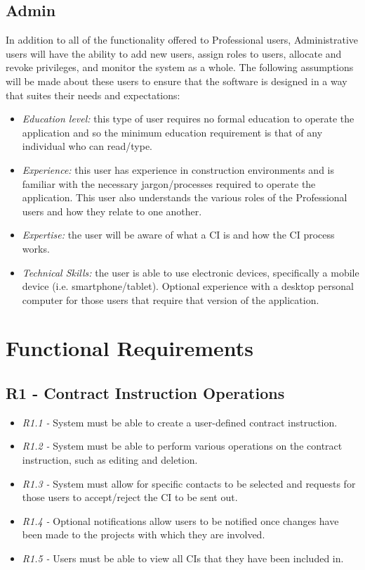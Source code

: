 \documentclass[11pt]{article}
\begin{document}
\subsection{Admin}
In addition to all of the functionality offered to Professional users, Administrative users will have the ability to add new users, assign roles to users, allocate and revoke privileges, and monitor the system as a whole. The following assumptions will be made about these users to ensure that the software is designed in a way that suites their needs and expectations:
\begin{itemize}
    \item \textit{Education level:} this type of user requires no formal education to operate the application and so the minimum education requirement is that of any individual who can read/type.
    \item \textit{Experience:} this user has experience in construction environments and is familiar with the necessary jargon/processes required to operate the application. This user also understands the various roles of the Professional users and how they relate to one another.
    \item \textit{Expertise:} the user will be aware of what a CI is and how the CI process works.
    \item \textit{Technical Skills:} the user is able to use electronic devices, specifically a mobile device (i.e. smartphone/tablet). Optional experience with a desktop personal computer for those users that require that version of the application.
\end{itemize}
\newpage

\section{Functional Requirements}
\subsection{R1 - Contract Instruction Operations}
\begin{itemize}
    \item \textit{R1.1 -} System must be able to create a user-defined contract instruction.
    \item \textit{R1.2 -} System must be able to perform various operations on the contract instruction, such as editing and deletion.
    \item \textit{R1.3 -} System must allow for specific contacts to be selected and requests for those users to accept/reject the CI to be sent out.
    \item \textit{R1.4 -} Optional notifications allow users to be notified once changes have been made to the projects with which they are involved.
    \item \textit{R1.5 -} Users must be able to view all CIs that they have been included in.
\end{itemize}
\end{document}
